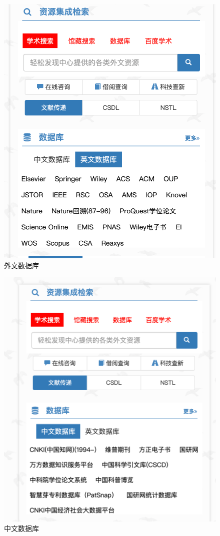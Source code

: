 \documentclass[
]{ctexbook}
\begin{document}
\begin{figure}
\centering
\includegraphics{Fig/ch5/lib1-fs8.png}
\caption{外文数据库}
\end{figure}

\begin{figure}
\centering
\includegraphics{Fig/ch5/lib2-fs8.png}
\caption{中文数据库}
\end{figure}
\end{document}
